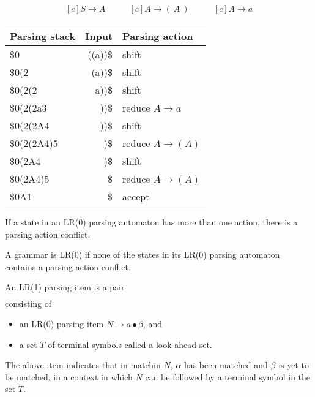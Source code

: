 \begin{equation*}
    \begin{aligned}[c]
        S \rightarrow A
    \end{aligned}
    \qquad 
    \begin{aligned}[c]
        A \rightarrow (\ A\ )
    \end{aligned}
    \qquad 
    \begin{aligned}[c]
        A \rightarrow a
    \end{aligned}
\end{equation*}
\begin{center}
    \begin{tabular}{|lr|l|}
        \hline
        Parsing stack \hspace{0.5cm} & Input & Parsing action \\
        \hline
        \$0 & ((a))\$ & shift \\
        \$0(2 & (a))\$ & shift \\
        \$0(2(2 & a))\$ & shift \\
        \$0(2(2a3 & ))\$ & reduce $A \rightarrow a$ \\
        \$0(2(2A4 & ))\$ & shift \\
        \$0(2(2A4)5 & )\$ & reduce \( A \rightarrow (A)\) \\
        \$0(2A4 & )\$ & shift \\
        \$0(2A4)5 & \$ & reduce \( A \rightarrow (A)\) \\
        \$0A1 & \$ & accept \\
        \hline
    \end{tabular}
\end{center}


If a state in an LR(0) parsing automaton has more than one action, 
there is a parsing action conflict.

A grammar is LR(0) if none of the states in its LR(0) parsing 
automaton contains a parsing action conflict.

An LR(1) parsing item is a pair
\begin{align*}
    [N \rightarrow \alpha \bullet \beta, T]
\end{align*}
consisting of
\begin{itemize}
    \item an LR(0) parsing item $N \rightarrow a \bullet \beta$, and
    \item a set $T$ of terminal symbols called a look-ahead set.
\end{itemize}
The above item indicates that in matchin $N$, $\alpha$ has been matched and $\beta$ is yet 
to be matched, in a context in which $N$ can be followed by a terminal symbol in the set $T$.

